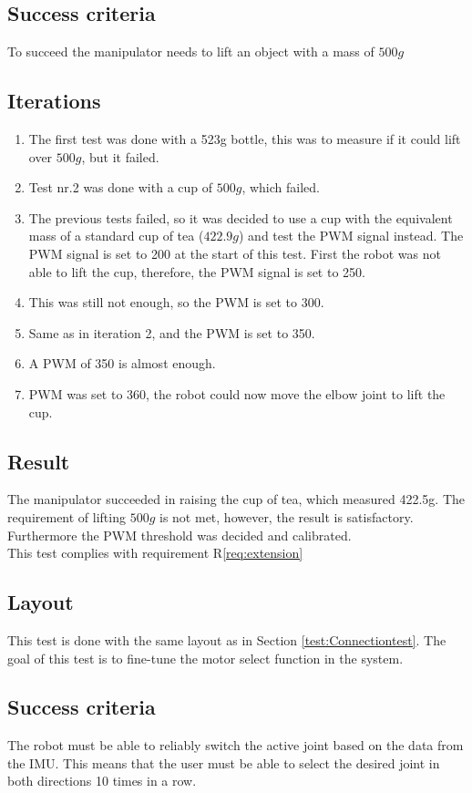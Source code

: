 \subsection*{Success criteria}
To succeed the manipulator needs to lift an object with a mass of $500g$
\subsection*{Iterations}
\begin{enumerate}
    \item The first test was done with a 523g bottle, this was to measure if it could lift over $500g$, but it failed.
    \item Test nr.2 was done with a cup of $500g$, which failed. 
    \item The previous tests failed, so it was decided to use a cup with the equivalent mass of a standard cup of tea ($422.9g$)  and test the PWM signal instead. The PWM signal is set to 200 at the start of this test. First the robot was not able to lift the cup, therefore, the PWM signal is set to 250.
    \item This was still not enough, so the PWM is set to 300. 
    \item Same as in iteration 2, and the PWM is set to 350.
    \item A PWM of 350 is almost enough.
    \item PWM was set to 360, the robot could now move the elbow joint to lift the cup.
\end{enumerate}
\subsection*{Result}
The manipulator succeeded in raising the cup of tea, which measured 422.5g. The requirement of lifting $500g$ is not met, however, the result is satisfactory. Furthermore the PWM threshold was decided and calibrated.\\
This test complies with requirement R\ref{req:extension}
\newpage
{}
\subsection*{Layout}
This test is done with the same layout as in Section \ref{test:Connectiontest}. The goal of this test is to fine-tune the motor select function in the system. 
\subsection*{Success criteria}
 The robot must be able to reliably switch the active joint based on the data from the IMU. This means that the user must be able to select the desired joint in both directions 10 times in a row.
